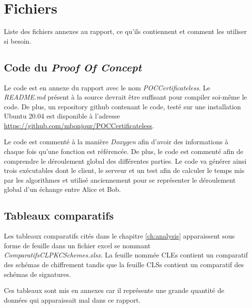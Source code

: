 \chapter{Fichiers}
\label{ch:fichiers}
Liste des fichiers annexes au rapport, ce qu'ils contiennent et comment les utiliser si besoin.
\section{Code du \textit{Proof Of Concept}}
Le code est en annexe du rapport avec le nom \textit{POCCertificateless}.
Le \textit{README.md} présent à la source devrait être suffisant pour compiler soi-même le code. De plus, un repository github contenant le code, testé sur une installation Ubuntu 20.04 est disponible à l'adresse \url{https://github.com/mbonjour/POCCertificateless}.

Le code est commenté à la manière \textit{Doxygen} afin d'avoir des informations à chaque fois qu'une fonction est référencée. De plus, le code est commenté afin de comprendre le déroulement global des différentes parties. Le code va générer ainsi trois exécutables dont le client, le serveur et un test afin de calculer le temps mis par les algorithmes et utilisé anciennement pour se représenter le déroulement global d'un échange entre Alice et Bob.
\section{Tableaux comparatifs}
Les tableaux comparatifs cités dans le chapitre \ref{ch:analysis} apparaissent sous forme de feuille dans un fichier excel se nommant \textit{ComparatifsCLPKCSchemes.xlsx}. 
La feuille nommée CLEs contient un comparatif des schémas de chiffrement tandis que la feuille CLSs contient un comparatif des schémas de signatures.

Ces tableaux sont mis en annexes car il représente une grande quantité de données qui apparaissait mal dans ce rapport.